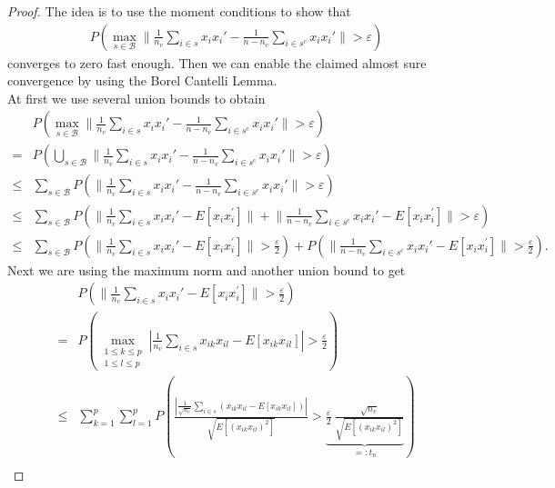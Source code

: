 \documentclass[Research_Module_ES.tex]{subfiles}
\begin{document}
\begin{proof}
 The idea is to use the moment conditions to show that 
 \begin{align*}
 P\left( \max_{s\in \mathcal{B}}\biggl\lVert \frac{1}{n_v}\sum_{i\in s}x_ix_i' - \frac{1}{n-n_v}\sum_{i\in s^c}x_ix_i'\biggr\rVert>\varepsilon\right)
 \end{align*}
 converges to zero fast enough.
Then we can enable the claimed almost sure convergence by using the Borel Cantelli Lemma.\\

At first we use several union bounds to obtain
\begin{align}\nonumber
&P\left( \max_{s\in \mathcal{B}}\biggl\lVert \frac{1}{n_v}\sum_{i\in s}x_ix_i' - \frac{1}{n-n_v}\sum_{i\in s^c}x_ix_i'\biggr\rVert>\varepsilon\right)\\\nonumber
=&P\left( \bigcup_{s\in \mathcal{B}}\biggl\lVert \frac{1}{n_v}\sum_{i\in s}x_ix_i' - \frac{1}{n-n_v}\sum_{i\in s^c}x_ix_i'\biggr\rVert>\varepsilon\right)\\\nonumber
\leq&\sum_{s\in \mathcal{B}}P\left(\biggl\lVert \frac{1}{n_v}\sum_{i\in s}x_ix_i' - \frac{1}{n-n_v}\sum_{i\in s^c}x_ix_i'\biggr\rVert>\varepsilon\right)\\\nonumber
\leq&\sum_{s\in \mathcal{B}}P\left(\biggl\lVert \frac{1}{n_v}\sum_{i\in s}x_ix_i'-E[x_i x_i^\prime]\biggr\rVert+\biggl\lVert \frac{1}{n-n_v}\sum_{i\in s^c}x_ix_i'-E[x_i x_i^\prime]\biggr\rVert>\varepsilon\right)\\
\leq&\sum_{s\in \mathcal{B}}P\left(\biggl\lVert \frac{1}{n_v}\sum_{i\in s}x_ix_i'-E[x_i x_i^\prime]\biggr\rVert>\frac{\varepsilon}{2}\right)+P\left(\biggl\lVert \frac{1}{n-n_v}\sum_{i\in s^c}x_ix_i'-E[x_i x_i^\prime]\biggr\rVert>\frac{\varepsilon}{2}\right).\label{Viereck}
\end{align}
Next we are using the maximum norm and another union bound to get
\begin{align}\nonumber
&P\left(\biggl\lVert \frac{1}{n_v}\sum_{i\in s}x_ix_i'-E[x_i x_i^\prime]\biggr\rVert>\frac{\varepsilon}{2}\right)\\\nonumber
=&P\left(\max_{\substack{1\leq k \leq p \\1\leq l\leq p}}\left| \frac{1}{n_v}\sum_{i\in s}x_{ik}x_{il}-E[x_{ik} x_{il}]\right|>\frac{\varepsilon}{2}\right)\\\nonumber
\leq& \sum_{k=1}^{p}\sum_{l=1}^{p}P\left( \frac{\left|\frac{1}{\sqrt{n_v}}\sum_{i\in s}\left(x_{ik}x_{il}-E[x_{ik}x_{il}]\right)\right|}{\sqrt{E[(x_{ik}x_{il})^2]}}>\underbrace{\frac{\varepsilon}{2}~ \frac{\sqrt{n_v}}{\sqrt{E[(x_{ik}x_{il})^2]}}}_{=:t_n}\right)\\

\end{align}
\end{proof}
\end{document}
